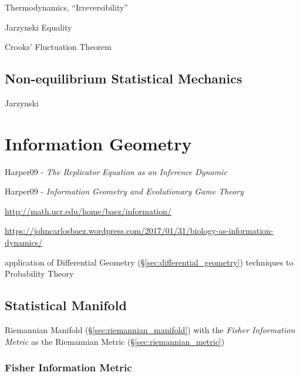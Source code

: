 Thermodynamics, ``Irreversibility''

Jarzynski Equality

Crooks' Fluctuation Theorem



\subsection{Non-equilibrium Statistical Mechanics}
\label{sec:nonequilibrium_statistical_mechanics}

Jarzynski



\section{Information Geometry}\label{sec:information_geometry}

Harper09 - \emph{The Replicator Equation as an Inference Dynamic}

Harper09 - \emph{Information Geometry and Evolutionary Game Theory}

\url{http://math.ucr.edu/home/baez/information/}

\url{https://johncarlosbaez.wordpress.com/2017/01/31/biology-as-information-dynamics/}

application of Differential Geometry
(\S\ref{sec:differential_geometry}) techniques to Probability Theory



\subsection{Statistical Manifold}\label{sec:statistical_manifold}

Riemannian Manifold (\S\ref{sec:riemannian_manifold}) with the
\emph{Fisher Information Metric} as the Riemannian Metric
(\S\ref{sec:riemannian_metric})



\subsubsection{Fisher Information Metric}
\label{sec:fisher_information}

